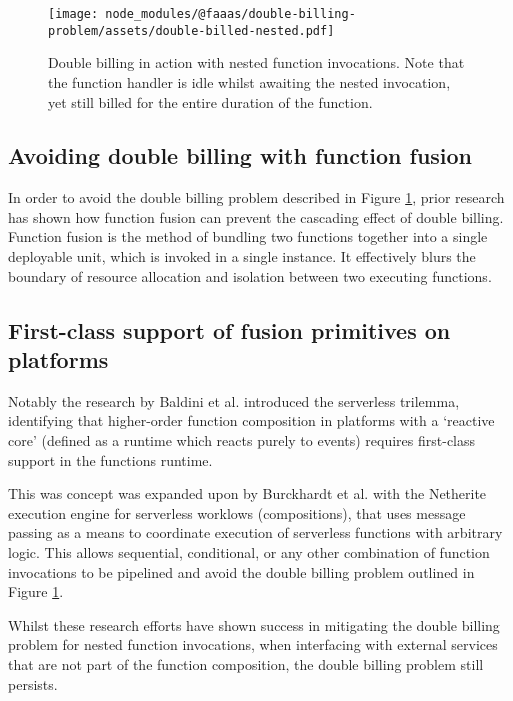\begin{figure}[t]
    \texttt{[image: node\_modules/@faaas/double-billing-problem/assets/double-billed-nested.pdf]}
    \caption{Double billing in action with nested function invocations. Note that the function handler is idle whilst awaiting the nested invocation, yet still billed for the entire duration of the function.}
    \label{fig:double-billing-nested}
\end{figure}

\subsection{Avoiding double billing with function fusion}
\label{sec:function-fusion}
In order to avoid the double billing problem described in Figure \ref{fig:double-billing-nested}, prior research\cite{schirmerFusionizeImprovingServerless2022, elgamalCostlessOptimizingCost2018} has shown how function fusion can prevent the cascading effect of double billing. Function fusion is the method of bundling two functions together into a single deployable unit, which is invoked in a single instance. It effectively blurs the boundary of resource allocation and isolation between two executing functions.

\subsection{First-class support of fusion primitives on \faas{} platforms}
\label{sec:fusion-primitives}
Notably the research by Baldini et al. introduced the serverless trilemma\cite{baldiniServerlessTrilemmaFunction2017}, identifying that higher-order function composition in platforms with a `reactive core' (defined as a runtime which reacts purely to events) requires first-class support in the functions runtime.

This was concept was expanded upon by Burckhardt et al. with the Netherite\cite{burckhardtNetheriteEfficientExecution2022} execution engine for serverless worklows (compositions), that uses message passing as a means to coordinate execution of serverless functions with arbitrary logic. This allows sequential, conditional, or any other combination of function invocations to be pipelined and avoid the double billing problem outlined in Figure \ref{fig:double-billing-nested}.

Whilst these research efforts have shown success in mitigating the double billing problem for nested function invocations, when interfacing with external services that are not part of the function composition, the double billing problem still persists.

